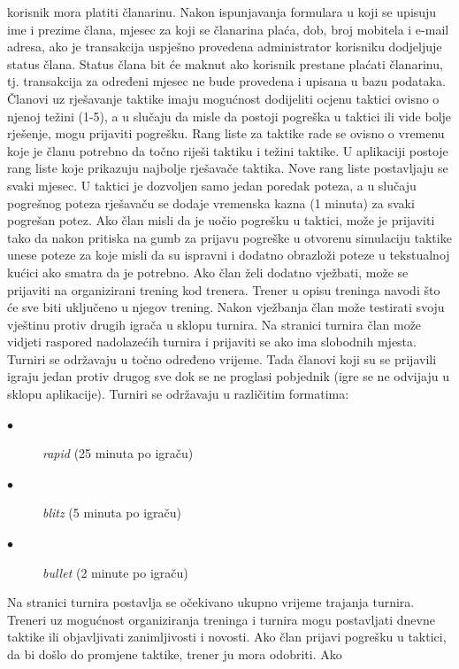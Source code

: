 			korisnik mora platiti članarinu. Nakon ispunjavanja formulara u koji se
			upisuju ime i prezime člana, mjesec za koji se članarina plaća, dob,
			broj mobitela i e-mail adresa, ako je transakcija uspješno provedena
			administrator korisniku dodjeljuje status člana. Status člana bit će
			maknut ako korisnik prestane plaćati članarinu, tj. transakcija za
			određeni mjesec ne bude provedena i upisana u bazu podataka. Članovi uz
			rješavanje taktike imaju mogućnost dodijeliti ocjenu taktici ovisno o
			njenoj težini (1-5), a u slučaju da misle da postoji pogreška u taktici
			ili vide bolje rješenje, mogu prijaviti pogrešku. Rang liste za taktike
			rade se ovisno o vremenu koje je članu potrebno da točno riješi taktiku
			i težini taktike. U aplikaciji postoje rang liste koje prikazuju
			najbolje rješavače taktika. Nove rang liste postavljaju se svaki mjesec.
			U taktici je dozvoljen samo jedan poredak poteza, a u slučaju pogrešnog
			poteza rješavaču se dodaje vremenska kazna (1 minuta) za svaki pogrešan
			potez. Ako član misli da je uočio pogrešku u taktici, može je prijaviti
			tako da nakon pritiska na gumb za prijavu pogreške u otvorenu simulaciju
			taktike unese poteze za koje misli da su ispravni i dodatno obrazloži
			poteze u tekstualnoj kućici ako smatra da je potrebno. Ako član želi
			dodatno vježbati, može se prijaviti na organizirani trening kod trenera.
			Trener u opisu treninga navodi što će sve biti uključeno u njegov
			trening. Nakon vježbanja član može testirati svoju vještinu protiv
			drugih igrača u sklopu turnira. Na stranici turnira član može vidjeti
			raspored nadolazećih turnira i prijaviti se ako ima slobodnih mjesta.
			Turniri se održavaju u točno određeno vrijeme. Tada članovi koji su se
			prijavili igraju jedan protiv drugog sve dok se ne proglasi pobjednik
			(igre se ne odvijaju u sklopu aplikacije). Turniri se održavaju u
			različitim formatima:
			\begin{description} 
			\item[$\bullet$] \textit{rapid} (25 minuta po igraču)
		    \item[$\bullet$] \textit{blitz} (5 minuta po igraču)
			\item[$\bullet$] \textit{bullet} (2 minute po igraču)
		    \end{description}
			 Na stranici turnira postavlja se
			očekivano ukupno vrijeme trajanja turnira. Treneri uz mogućnost
			organiziranja treninga i turnira mogu postavljati dnevne taktike ili
			objavljivati zanimljivosti i novosti. Ako član prijavi pogrešku u
			taktici, da bi došlo do promjene taktike, trener ju mora odobriti. Ako
